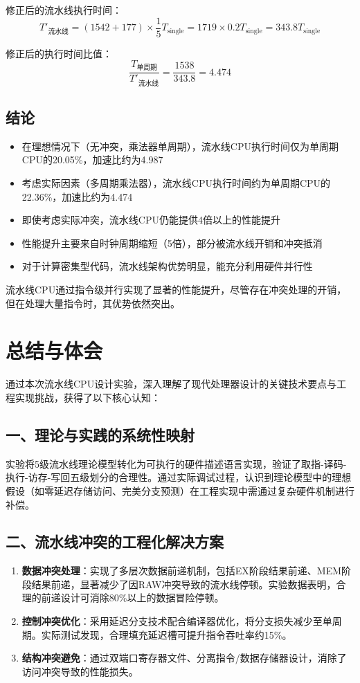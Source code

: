 \documentclass[12pt,a4paper]{article}
\begin{document}
修正后的流水线执行时间：
\[
T'_{\text{流水线}} = (1542 + 177) \times \frac{1}{5}T_{\text{single}} = 1719 \times 0.2T_{\text{single}} = 343.8T_{\text{single}}
\]

修正后的执行时间比值：
\[
\frac{T_{\text{单周期}}}{T'_{\text{流水线}}} = \frac{1538}{343.8} = 4.474
\]

\subsection{结论}
\begin{itemize}
    \item 在理想情况下（无冲突，乘法器单周期），流水线CPU执行时间仅为单周期CPU的20.05\%，加速比约为4.987
    \item 考虑实际因素（多周期乘法器），流水线CPU执行时间约为单周期CPU的22.36\%，加速比约为4.474
    \item 即使考虑实际冲突，流水线CPU仍能提供4倍以上的性能提升
    \item 性能提升主要来自时钟周期缩短（5倍），部分被流水线开销和冲突抵消
    \item 对于计算密集型代码，流水线架构优势明显，能充分利用硬件并行性
\end{itemize}

流水线CPU通过指令级并行实现了显著的性能提升，尽管存在冲突处理的开销，但在处理大量指令时，其优势依然突出。



\section{总结与体会}
通过本次流水线CPU设计实验，深入理解了现代处理器设计的关键技术要点与工程实现挑战，获得了以下核心认知：

\subsection*{一、理论与实践的系统性映射}
实验将5级流水线理论模型转化为可执行的硬件描述语言实现，验证了取指-译码-执行-访存-写回五级划分的合理性。通过实际调试过程，认识到理论模型中的理想假设（如零延迟存储访问、完美分支预测）在工程实现中需通过复杂硬件机制进行补偿。

\subsection*{二、流水线冲突的工程化解决方案}
\begin{enumerate}
    \item \textbf{数据冲突处理}：实现了多层次数据前递机制，包括EX阶段结果前递、MEM阶段结果前递，显著减少了因RAW冲突导致的流水线停顿。实验数据表明，合理的前递设计可消除80\%以上的数据冒险停顿。
    \item \textbf{控制冲突优化}：采用延迟分支技术配合编译器优化，将分支损失减少至单周期。实际测试发现，合理填充延迟槽可提升指令吞吐率约15\%。
    \item \textbf{结构冲突避免}：通过双端口寄存器文件、分离指令/数据存储器设计，消除了访问冲突导致的性能损失。
\end{enumerate}
\end{document}

